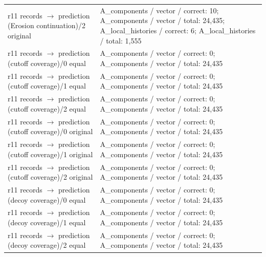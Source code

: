 \begin{longtable}{@{}>{\raggedright\arraybackslash}p{1.800in}>{\raggedright\arraybackslash}p{4.200in}@{}}
r11 records $\to$ prediction (Erosion continuation)/\allowbreak{}2 original & A\_\allowbreak{}components /\allowbreak{} vector /\allowbreak{} correct: 10; A\_\allowbreak{}components /\allowbreak{} vector /\allowbreak{} total: 24,435; A\_\allowbreak{}local\_\allowbreak{}histories /\allowbreak{} correct: 6; A\_\allowbreak{}local\_\allowbreak{}histories /\allowbreak{} total: 1,555 \\
r11 records $\to$ prediction (cutoff coverage)/\allowbreak{}0 equal & A\_\allowbreak{}components /\allowbreak{} vector /\allowbreak{} correct: 0; A\_\allowbreak{}components /\allowbreak{} vector /\allowbreak{} total: 24,435 \\
r11 records $\to$ prediction (cutoff coverage)/\allowbreak{}1 equal & A\_\allowbreak{}components /\allowbreak{} vector /\allowbreak{} correct: 0; A\_\allowbreak{}components /\allowbreak{} vector /\allowbreak{} total: 24,435 \\
r11 records $\to$ prediction (cutoff coverage)/\allowbreak{}2 equal & A\_\allowbreak{}components /\allowbreak{} vector /\allowbreak{} correct: 0; A\_\allowbreak{}components /\allowbreak{} vector /\allowbreak{} total: 24,435 \\
r11 records $\to$ prediction (cutoff coverage)/\allowbreak{}0 original & A\_\allowbreak{}components /\allowbreak{} vector /\allowbreak{} correct: 0; A\_\allowbreak{}components /\allowbreak{} vector /\allowbreak{} total: 24,435 \\
r11 records $\to$ prediction (cutoff coverage)/\allowbreak{}1 original & A\_\allowbreak{}components /\allowbreak{} vector /\allowbreak{} correct: 0; A\_\allowbreak{}components /\allowbreak{} vector /\allowbreak{} total: 24,435 \\
r11 records $\to$ prediction (cutoff coverage)/\allowbreak{}2 original & A\_\allowbreak{}components /\allowbreak{} vector /\allowbreak{} correct: 0; A\_\allowbreak{}components /\allowbreak{} vector /\allowbreak{} total: 24,435 \\
r11 records $\to$ prediction (decoy coverage)/\allowbreak{}0 equal & A\_\allowbreak{}components /\allowbreak{} vector /\allowbreak{} correct: 0; A\_\allowbreak{}components /\allowbreak{} vector /\allowbreak{} total: 24,435 \\
r11 records $\to$ prediction (decoy coverage)/\allowbreak{}1 equal & A\_\allowbreak{}components /\allowbreak{} vector /\allowbreak{} correct: 0; A\_\allowbreak{}components /\allowbreak{} vector /\allowbreak{} total: 24,435 \\
r11 records $\to$ prediction (decoy coverage)/\allowbreak{}2 equal & A\_\allowbreak{}components /\allowbreak{} vector /\allowbreak{} correct: 0; A\_\allowbreak{}components /\allowbreak{} vector /\allowbreak{} total: 24,435 \\

\end{longtable}
